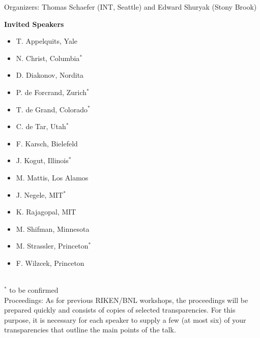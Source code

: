 Organizers: Thomas Schaefer (INT, Seattle) and Edward Shuryak (Stony
Brook) 

\newpage
\vspace*{-2cm}
\centerline{\large\bf Invited Speakers}
\vspace*{0.6cm}

\begin{minipage}{60mm}
\begin{itemize}

\item T. Appelquits, Yale 

\item N. Christ, Columbia$^*$ 

\item D. Diakonov, Nordita 

\item P. de Forcrand, Zurich$^*$ 

\item T. de Grand, Colorado$^*$ 

\item C. de Tar, Utah$^*$ 

\item F. Karsch, Bielefeld 

\end{itemize}
\end{minipage}
\begin{minipage}{60mm}
\begin{itemize}

\item J. Kogut, Illinois$^*$ 

\item M. Mattis, Los Alamos 

\item J. Negele, MIT$^*$ 

\item K. Rajagopal, MIT

\item M. Shifman, Minnesota 

\item M. Strassler, Princeton$^*$

\item F. Wilzcek, Princeton 
\end{itemize}
\end{minipage}
\\
$^*$ to be confirmed\\

\noindent
Proceedings: 
As for previous RIKEN/BNL workshops, the proceedings will be prepared 
quickly and consists of copies of selected transparencies. For this 
purpose, it is necessary for each speaker to supply a few (at most six) 
of your transparencies that outline the main points of the talk.\\

